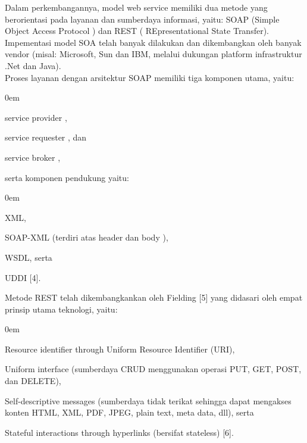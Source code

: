\documentclass{jtetiproposalskripsi}
\begin{document}
Dalam perkembangannya, model  web service  memiliki dua metode yang berorientasi pada layanan dan sumberdaya informasi, yaitu: SOAP (Simple Object Access Protocol ) dan REST ( REpresentational State Transfer). Impementasi model SOA telah banyak dilakukan dan dikembangkan oleh banyak  vendor  (misal: Microsoft, Sun dan IBM, melalui dukungan platform infrastruktur  .Net  dan Java).
\\
Proses layanan dengan arsitektur SOAP memiliki tiga komponen utama, yaitu:
\vspace{-0.5cm}
\begin{enumerate}[a.]
\begin{singlespace}
\itemsep0em
\item service provider ,
\item service requester , dan 
\item service broker , 
\end{singlespace}
\end{enumerate}
serta komponen pendukung yaitu: 
\vspace{-0.5cm}
\begin{enumerate}[a.]
\begin{singlespace}
\itemsep0em
\item XML,
\item SOAP-XML (terdiri atas  header  dan body ),
\item WSDL, serta 
\item UDDI  [4]. 
\end{singlespace}
\end{enumerate}
Metode REST telah dikembangkankan oleh  Fielding [5] yang didasari oleh empat prinsip utama teknologi, yaitu: 
\vspace{-0.5cm}
\begin{enumerate}[a.]
\begin{singlespace}
\itemsep0em
\item Resource identifier through Uniform Resource Identifier  (URI), 
\item Uniform interface (sumberdaya CRUD menggunakan operasi PUT, GET, POST, dan DELETE),
\item Self-descriptive messages (sumberdaya tidak terikat sehingga dapat mengakses konten HTML, XML, PDF, JPEG, plain text, meta data, dll), serta
\item Stateful interactions through hyperlinks  (bersifat  stateless)  [6].
\end{singlespace}
\end{enumerate}
\end{document}
